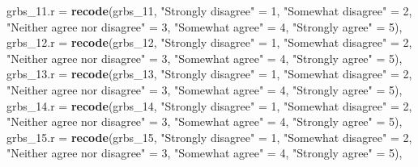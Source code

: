 \documentclass[
]{article}
\newenvironment{Shaded}{\begin{snugshade}}{\end{snugshade}}
\newcommand{\DataTypeTok}[1]{\textcolor[rgb]{0.13,0.29,0.53}{#1}}
\newcommand{\DecValTok}[1]{\textcolor[rgb]{0.00,0.00,0.81}{#1}}
\newcommand{\KeywordTok}[1]{\textcolor[rgb]{0.13,0.29,0.53}{\textbf{#1}}}
\newcommand{\NormalTok}[1]{#1}
\newcommand{\StringTok}[1]{\textcolor[rgb]{0.31,0.60,0.02}{#1}}
\begin{document}
\begin{Shaded}
\begin{Highlighting}[]
         \DataTypeTok{grbs\_11.r =} \KeywordTok{recode}\NormalTok{(grbs\_}\DecValTok{11}\NormalTok{,  }\StringTok{"Strongly disagree"}\NormalTok{ =}\StringTok{ }\DecValTok{1}\NormalTok{, }\StringTok{"Somewhat disagree"}\NormalTok{ =}\StringTok{ }\DecValTok{2}\NormalTok{, }\StringTok{"Neither agree nor disagree"}\NormalTok{ =}\StringTok{ }\DecValTok{3}\NormalTok{, }\StringTok{"Somewhat agree"}\NormalTok{ =}\StringTok{ }\DecValTok{4}\NormalTok{, }\StringTok{"Strongly agree"}\NormalTok{ =}\StringTok{ }\DecValTok{5}\NormalTok{),}
         \DataTypeTok{grbs\_12.r =} \KeywordTok{recode}\NormalTok{(grbs\_}\DecValTok{12}\NormalTok{,  }\StringTok{"Strongly disagree"}\NormalTok{ =}\StringTok{ }\DecValTok{1}\NormalTok{, }\StringTok{"Somewhat disagree"}\NormalTok{ =}\StringTok{ }\DecValTok{2}\NormalTok{, }\StringTok{"Neither agree nor disagree"}\NormalTok{ =}\StringTok{ }\DecValTok{3}\NormalTok{, }\StringTok{"Somewhat agree"}\NormalTok{ =}\StringTok{ }\DecValTok{4}\NormalTok{, }\StringTok{"Strongly agree"}\NormalTok{ =}\StringTok{ }\DecValTok{5}\NormalTok{),}
         \DataTypeTok{grbs\_13.r =} \KeywordTok{recode}\NormalTok{(grbs\_}\DecValTok{13}\NormalTok{,  }\StringTok{"Strongly disagree"}\NormalTok{ =}\StringTok{ }\DecValTok{1}\NormalTok{, }\StringTok{"Somewhat disagree"}\NormalTok{ =}\StringTok{ }\DecValTok{2}\NormalTok{, }\StringTok{"Neither agree nor disagree"}\NormalTok{ =}\StringTok{ }\DecValTok{3}\NormalTok{, }\StringTok{"Somewhat agree"}\NormalTok{ =}\StringTok{ }\DecValTok{4}\NormalTok{, }\StringTok{"Strongly agree"}\NormalTok{ =}\StringTok{ }\DecValTok{5}\NormalTok{),}
         \DataTypeTok{grbs\_14.r =} \KeywordTok{recode}\NormalTok{(grbs\_}\DecValTok{14}\NormalTok{,  }\StringTok{"Strongly disagree"}\NormalTok{ =}\StringTok{ }\DecValTok{1}\NormalTok{, }\StringTok{"Somewhat disagree"}\NormalTok{ =}\StringTok{ }\DecValTok{2}\NormalTok{, }\StringTok{"Neither agree nor disagree"}\NormalTok{ =}\StringTok{ }\DecValTok{3}\NormalTok{, }\StringTok{"Somewhat agree"}\NormalTok{ =}\StringTok{ }\DecValTok{4}\NormalTok{, }\StringTok{"Strongly agree"}\NormalTok{ =}\StringTok{ }\DecValTok{5}\NormalTok{),}
         \DataTypeTok{grbs\_15.r =} \KeywordTok{recode}\NormalTok{(grbs\_}\DecValTok{15}\NormalTok{,  }\StringTok{"Strongly disagree"}\NormalTok{ =}\StringTok{ }\DecValTok{1}\NormalTok{, }\StringTok{"Somewhat disagree"}\NormalTok{ =}\StringTok{ }\DecValTok{2}\NormalTok{, }\StringTok{"Neither agree nor disagree"}\NormalTok{ =}\StringTok{ }\DecValTok{3}\NormalTok{, }\StringTok{"Somewhat agree"}\NormalTok{ =}\StringTok{ }\DecValTok{4}\NormalTok{, }\StringTok{"Strongly agree"}\NormalTok{ =}\StringTok{ }\DecValTok{5}\NormalTok{),}

\end{Highlighting}
\end{Shaded}
\end{document}
